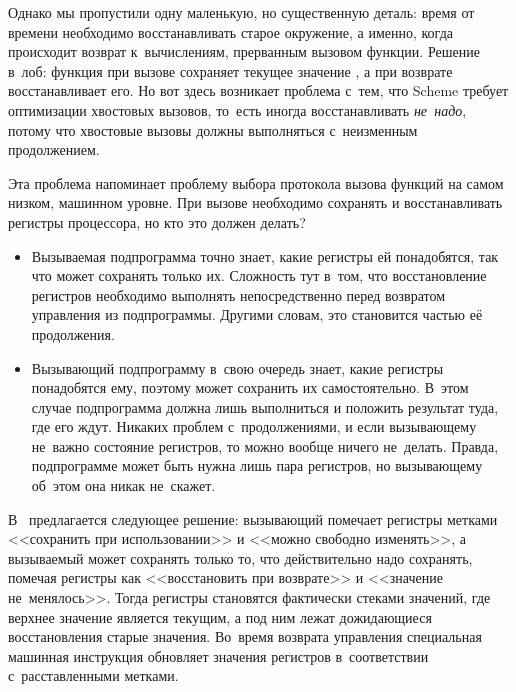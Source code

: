 Однако мы пропустили одну маленькую, но существенную деталь: время от времени
необходимо восстанавливать старое окружение, а именно, когда происходит возврат
к~вычислениям, прерванным вызовом функции. Решение в~лоб: функция при вызове
сохраняет текущее значение , а при возврате восстанавливает его. Но
вот здесь возникает проблема с~тем, что Scheme требует оптимизации хвостовых
вызовов, то~есть иногда  восстанавливать \emph{не~надо}, потому что
хвостовые вызовы должны выполняться с~неизменным продолжением.

Эта проблема напоминает проблему выбора протокола вызова функций на самом
низком, машинном уровне. При вызове необходимо сохранять и восстанавливать
регистры процессора, но кто это должен делать?

\begin{itemize}
  \item Вызываемая подпрограмма точно знает, какие регистры ей
        понадобятся, так что может сохранять только их. Сложность тут
        в~том, что восстановление регистров необходимо выполнять
        непосредственно перед возвратом управления из подпрограммы.
        Другими словам, это становится частью её продолжения.

  \item Вызывающий подпрограмму в~свою очередь знает, какие регистры
        понадобятся ему, поэтому может сохранить их самостоятельно.
        В~этом случае подпрограмма должна лишь выполниться и положить
        результат туда, где его ждут. Никаких проблем с~продолжениями,
        и если вызывающему не~важно состояние регистров, то можно вообще
        ничего не~делать. Правда, подпрограмме может быть нужна лишь пара
        регистров, но вызывающему об~этом она никак не~скажет.
\end{itemize}

В~\cite{ss80} предлагается следующее решение: вызывающий помечает регистры
метками <<сохранить при использовании>> и <<можно свободно изменять>>, а
вызываемый может сохранять только то, что действительно надо сохранять, помечая
регистры как <<восстановить при возврате>> и <<значение не~менялось>>. Тогда
регистры становятся фактически стеками значений, где верхнее значение является
текущим, а под ним лежат дожидающиеся восстановления старые значения. Во~время
возврата управления специальная машинная инструкция обновляет значения регистров
в~соответствии с~расставленными метками.

